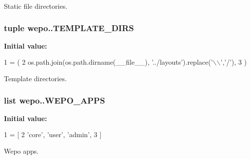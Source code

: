 Static file directories. 

\hypertarget{namespacewepo_1_1_ac24150b1d9b1462d35d17c14ba54b52c}{
\subsubsection[{T\-E\-M\-P\-L\-A\-T\-E\-\_\-\-D\-I\-R\-S}]{\setlength{\rightskip}{0pt plus 5cm}tuple wepo..\-T\-E\-M\-P\-L\-A\-T\-E\-\_\-\-D\-I\-R\-S}}\label{namespacewepo_1_1_ac24150b1d9b1462d35d17c14ba54b52c}
{\bfseries Initial value\-:}
\begin{DoxyCode}
1 = (
2    os.path.join(os.path.dirname(\_\_file\_\_), \textcolor{stringliteral}{'../layouts'}).replace(\textcolor{stringliteral}{'\(\backslash\)\(\backslash\)'},\textcolor{stringliteral}{'/'}),
3 )
\end{DoxyCode}


Template directories. 

\hypertarget{namespacewepo_1_1_a3aa6a5c3d50cbdc2d848fde01a99e04c}{
\subsubsection[{W\-E\-P\-O\-\_\-\-A\-P\-P\-S}]{\setlength{\rightskip}{0pt plus 5cm}list wepo..\-W\-E\-P\-O\-\_\-\-A\-P\-P\-S}}\label{namespacewepo_1_1_a3aa6a5c3d50cbdc2d848fde01a99e04c}
{\bfseries Initial value\-:}
\begin{DoxyCode}
1 = [
2    \textcolor{stringliteral}{'core'}, \textcolor{stringliteral}{'user'}, \textcolor{stringliteral}{'admin'},
3 ]
\end{DoxyCode}


Wepo apps. 

